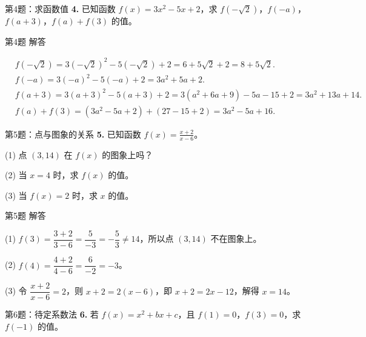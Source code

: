 \documentclass[10pt,aspectratio=169,serif]{beamer}
\begin{document}
\begin{frame}[t]{第4题：求函数值}
\textbf{4.} 已知函数 $f(x)=3x^2-5x+2$，求 $f(-\sqrt{2})$，$f(-a)$，$f(a+3)$，$f(a)+f(3)$ 的值。
\end{frame}

\begin{frame}[t]{第4题 解答}
\begin{tcolorbox}[colback=orange!10,colframe=orange,title=\textbf{解:}]
	\begin{align*}
		&f(-\sqrt{2})=3(-\sqrt{2})^2-5(-\sqrt{2})+2=6+5\sqrt{2}+2=8+5\sqrt{2}.\\
		&f(-a)=3(-a)^2-5(-a)+2=3a^2+5a+2.\\
		&f(a+3)=3(a+3)^2-5(a+3)+2=3(a^2+6a+9)-5a-15+2
		=3a^2+13a+14.\\
		&f(a)+f(3)=(3a^2-5a+2)+(27-15+2)=3a^2-5a+16.
	\end{align*}
		

\end{tcolorbox}
\end{frame}

\begin{frame}[t]{第5题：点与图象的关系}
\textbf{5.} 已知函数 $\displaystyle f(x)=\frac{x+2}{x-6}$。

\vspace{0.8em}
(1) 点 $(3,14)$ 在 $f(x)$ 的图象上吗？

\vspace{0.8em}
(2) 当 $x=4$ 时，求 $f(x)$ 的值。

\vspace{0.8em}
(3) 当 $f(x)=2$ 时，求 $x$ 的值。
\end{frame}

\begin{frame}[t]{第5题 解答}
\begin{tcolorbox}[colback=orange!10,colframe=orange,title=\textbf{解}]
(1) $f(3)=\dfrac{3+2}{3-6}=\dfrac{5}{-3}=-\dfrac{5}{3}\neq 14$，所以点 $(3,14)$ \alert{不在}图象上。

(2) $f(4)=\dfrac{4+2}{4-6}=\dfrac{6}{-2}=-3$。

(3) 令 $\dfrac{x+2}{x-6}=2$，则 $x+2=2(x-6)$，即 $x+2=2x-12$，解得 $x=14$。
\end{tcolorbox}
\end{frame}

\begin{frame}[t]{第6题：待定系数法}
\textbf{6.} 若 $f(x)=x^2+bx+c$，且 $f(1)=0$，$f(3)=0$，求 $f(-1)$ 的值。
\end{frame}
\end{document}
